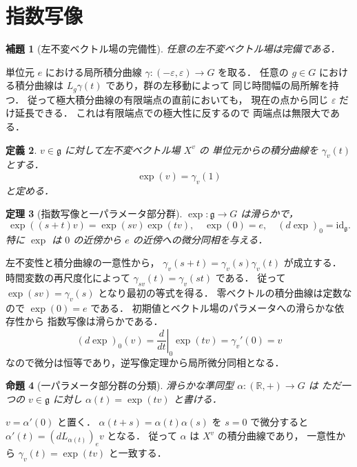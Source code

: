 \documentclass[a5paper,10pt,onecolumn]{jsarticle}
\makeatletter
\theoremstyle{mathnotetheorem}
\newtheorem{theorem}{定理}[section]
\newtheorem{definition}[theorem]{定義}
\newtheorem{lemma}[theorem]{補題}
\newtheorem{proposition}[theorem]{命題}
\renewcommand{\proofname}{証明}
\renewenvironment{proof}[1][\proofname]{%
  \par\pushQED{\qed}\normalfont\topsep4\p@\@plus2\p@\relax
  \trivlist\item[\hskip\labelsep\bfseries #1]\ignorespaces
}{\popQED\endtrivlist\@endpefalse}
\makeatother
\begin{document}
\section{指数写像}
\begin{lemma}[左不変ベクトル場の完備性]\label{lem:complete}
任意の左不変ベクトル場は完備である．
\end{lemma}
\begin{proof}
単位元 $e$ における局所積分曲線
$\gamma:(-\varepsilon,\varepsilon)\to G$ を取る．
任意の $g\in G$ における積分曲線は
$L_g\gamma(t)$ であり，群の左移動によって
同じ時間幅の局所解を持つ．
従って極大積分曲線の有限端点の直前においても，
現在の点から同じ $\varepsilon$ だけ延長できる．
これは有限端点での極大性に反するので
両端点は無限大である．
\end{proof}
\begin{definition}
$v\in\mathfrak g$ に対して左不変ベクトル場 $X^v$ の
単位元からの積分曲線を $\gamma_v(t)$ とする．
\[
 \exp(v)=\gamma_v(1)
\]
と定める．
\end{definition}
\begin{theorem}[指数写像と一パラメータ部分群]\label{thm:exp}
$\exp:\mathfrak g\to G$ は滑らかで，
\[
 \exp((s+t)v)=\exp(sv)\exp(tv),\quad
 \exp(0)=e,\quad
 (d\exp)_0=\mathrm{id}_{\mathfrak g}.
\]
特に $\exp$ は $0$ の近傍から $e$ の近傍への微分同相を与える．
\end{theorem}
\begin{proof}
左不変性と積分曲線の一意性から，
$\gamma_v(s+t)=\gamma_v(s)\gamma_v(t)$ が成立する．
時間変数の再尺度化によって
$\gamma_{sv}(t)=\gamma_v(st)$ である．
従って $\exp(sv)=\gamma_v(s)$ となり最初の等式を得る．
零ベクトルの積分曲線は定数なので $\exp(0)=e$ である．
初期値とベクトル場のパラメータへの滑らかな依存性から
指数写像は滑らかである．
\[
 (d\exp)_0(v)=\left.\frac d{dt}\right|_0\exp(tv)
 =\gamma_v'(0)=v
\]
なので微分は恒等であり，逆写像定理から局所微分同相となる．
\end{proof}
\begin{proposition}[一パラメータ部分群の分類]
滑らかな準同型 $\alpha:(\mathbb R,+)\to G$ は
ただ一つの $v\in\mathfrak g$ に対し
$\alpha(t)=\exp(tv)$ と書ける．
\end{proposition}
\begin{proof}
$v=\alpha'(0)$ と置く．
$\alpha(t+s)=\alpha(t)\alpha(s)$ を $s=0$ で微分すると
$\alpha'(t)=(dL_{\alpha(t)})_e v$ となる．
従って $\alpha$ は $X^v$ の積分曲線であり，
一意性から $\gamma_v(t)=\exp(tv)$ と一致する．
\end{proof}
\end{document}
